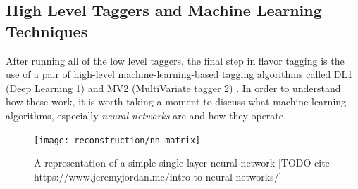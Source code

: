         \FloatBarrier
        \subsection{High Level Taggers and Machine Learning Techniques}

            After running all of the low level taggers,
                the final step in flavor tagging is the use of a pair of high-level machine-learning-based tagging algorithms
                called DL1 (Deep Learning 1) and MV2 (MultiVariate tagger 2)
                \cite{bjet_id_and_performance} \cite{btagging_optimisation}.
            In order to understand how these work, it is worth taking a moment to discuss what machine learning algorithms,
                especially \textit{neural networks} are and how they operate.

            \begin{figure}[tbh] \center
                \texttt{[image: reconstruction/nn\_matrix]}
                \caption{
                    A representation of a simple single-layer neural network
                    [TODO cite https://www.jeremyjordan.me/intro-to-neural-networks/]
                }
                \label{fig:nn_matrix}
            \end{figure}

